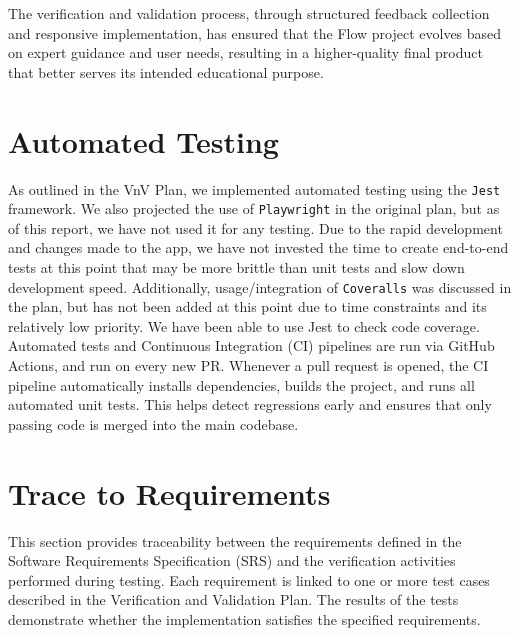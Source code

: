 \documentclass[12pt, titlepage]{article}
\begin{document}
The verification and validation process, through structured feedback
collection and responsive implementation, has ensured that the Flow
project evolves based on expert guidance and user needs, resulting in
a higher-quality final product that better serves its intended
educational purpose.

\section{Automated Testing}

As outlined in the VnV Plan, we implemented automated testing using the
\texttt{Jest} framework. We also projected the use of \texttt{Playwright} in the
original plan, but as of this report, we have not used it for any testing. Due
to the rapid development and changes made to the app, we have not invested the
time to create end-to-end tests at this point that may be more brittle than
unit tests and slow down development speed. Additionally, usage/integration of
\texttt{Coveralls} was discussed in the plan, but has not been added at this
point due to time constraints and its relatively low priority. We have been
able to use Jest to check code coverage.\\


Automated tests and Continuous Integration (CI) pipelines are run via GitHub 
Actions, and run on every new PR. Whenever a pull request is opened, the CI 
pipeline automatically installs dependencies, builds the project, and runs all 
automated unit tests. This helps detect regressions early and ensures that only 
passing code is merged into the main codebase.

\section{Trace to Requirements}

This section provides traceability between the requirements defined in the
Software Requirements Specification (SRS) and the verification activities
performed during testing. Each requirement is linked to one or more test
cases described in the Verification and Validation Plan. The results of the
tests demonstrate whether the implementation satisfies the specified
requirements.
\end{document}
